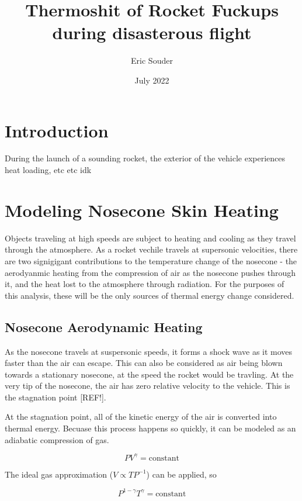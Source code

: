 \documentclass[twocolumn]{article}
\title{Thermoshit of Rocket Fuckups during disasterous flight}
\author{Eric Souder}
\date{July 2022}
\begin{document}
    \maketitle
    \begin{abstract}
    \end{abstract}
    \section{Introduction}
        During the launch of a sounding rocket, the exterior of the vehicle experiences
        heat loading, etc etc idk

    \section{Modeling Nosecone Skin Heating}
        Objects traveling at high speeds are subject to heating and cooling as 
        they travel through the atmosphere. As a rocket vechile travels at 
        supersonic velocities, there are two signigigant contributions to 
        the temperature change of the nosecone - the aerodyanmic heating from 
        the compression of air as the nosecone pushes through it, and the heat
        lost to the atmosphere through radiation. For the purposes of this 
        analysis, these will be the only sources of thermal energy change
        considered.
        \subsection{Nosecone Aerodynamic Heating}
            As the nosecone travels at suspersonic speeds, it forms a shock wave
            as it moves faster than the air can escape. This can also be
            considered as air being blown towards a stationary nosecone, at the
            speed the rocket would be travling. At the very tip of
            the nosecone, the air has zero relative velocity to the vehicle. 
            This is the stagnation point [REF!].

            At the stagnation point, all of the kinetic energy of the air is 
            converted into thermal energy. Becuase this process happens so
            quickly, it can be modeled as an adiabatic compression of gas.

            \[PV^\gamma = \textrm{constant}\]

            The ideal gas approximation ($V\propto TP^{-1}$) can be applied, so 

            \[P^{1-\gamma}T^\gamma=\textrm{constant}\]
\end{document}
